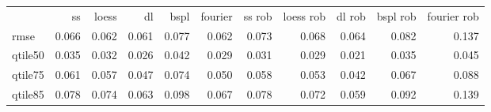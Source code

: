 \begin{tabular}{lrrrrrrrrrr}
 & ss & loess & dl & bspl & fourier & ss rob & loess rob & dl rob & bspl rob & fourier rob \\
rmse & {\cellcolor[HTML]{E1E1E1}} \color[HTML]{000000} 0.066 & {\cellcolor[HTML]{EEEEEE}} \color[HTML]{000000} 0.062 & {\cellcolor[HTML]{F1F1F1}} \color[HTML]{000000} 0.061 & {\cellcolor[HTML]{BFBFBF}} \color[HTML]{000000} 0.077 & {\cellcolor[HTML]{EEEEEE}} \color[HTML]{000000} 0.062 & {\cellcolor[HTML]{CBCBCB}} \color[HTML]{000000} 0.073 & {\cellcolor[HTML]{DBDBDB}} \color[HTML]{000000} 0.068 & {\cellcolor[HTML]{E7E7E7}} \color[HTML]{000000} 0.064 & {\cellcolor[HTML]{AFAFAF}} \color[HTML]{000000} 0.082 & {\cellcolor[HTML]{000000}} \color[HTML]{F1F1F1} 0.137 \\
qtile50 & {\cellcolor[HTML]{646464}} \color[HTML]{F1F1F1} 0.035 & {\cellcolor[HTML]{828282}} \color[HTML]{F1F1F1} 0.032 & {\cellcolor[HTML]{BFBFBF}} \color[HTML]{000000} 0.026 & {\cellcolor[HTML]{1D1D1D}} \color[HTML]{F1F1F1} 0.042 & {\cellcolor[HTML]{A0A0A0}} \color[HTML]{F1F1F1} 0.029 & {\cellcolor[HTML]{8D8D8D}} \color[HTML]{F1F1F1} 0.031 & {\cellcolor[HTML]{A0A0A0}} \color[HTML]{F1F1F1} 0.029 & {\cellcolor[HTML]{F1F1F1}} \color[HTML]{000000} 0.021 & {\cellcolor[HTML]{646464}} \color[HTML]{F1F1F1} 0.035 & {\cellcolor[HTML]{000000}} \color[HTML]{F1F1F1} 0.045 \\
qtile75 & {\cellcolor[HTML]{8E8E8E}} \color[HTML]{F1F1F1} 0.061 & {\cellcolor[HTML]{A2A2A2}} \color[HTML]{F1F1F1} 0.057 & {\cellcolor[HTML]{D7D7D7}} \color[HTML]{000000} 0.047 & {\cellcolor[HTML]{494949}} \color[HTML]{F1F1F1} 0.074 & {\cellcolor[HTML]{C7C7C7}} \color[HTML]{000000} 0.050 & {\cellcolor[HTML]{9D9D9D}} \color[HTML]{F1F1F1} 0.058 & {\cellcolor[HTML]{B7B7B7}} \color[HTML]{000000} 0.053 & {\cellcolor[HTML]{F1F1F1}} \color[HTML]{000000} 0.042 & {\cellcolor[HTML]{6D6D6D}} \color[HTML]{F1F1F1} 0.067 & {\cellcolor[HTML]{000000}} \color[HTML]{F1F1F1} 0.088 \\
qtile85 & {\cellcolor[HTML]{B8B8B8}} \color[HTML]{000000} 0.078 & {\cellcolor[HTML]{C4C4C4}} \color[HTML]{000000} 0.074 & {\cellcolor[HTML]{E5E5E5}} \color[HTML]{000000} 0.063 & {\cellcolor[HTML]{7C7C7C}} \color[HTML]{F1F1F1} 0.098 & {\cellcolor[HTML]{D9D9D9}} \color[HTML]{000000} 0.067 & {\cellcolor[HTML]{B8B8B8}} \color[HTML]{000000} 0.078 & {\cellcolor[HTML]{CACACA}} \color[HTML]{000000} 0.072 & {\cellcolor[HTML]{F1F1F1}} \color[HTML]{000000} 0.059 & {\cellcolor[HTML]{8E8E8E}} \color[HTML]{F1F1F1} 0.092 & {\cellcolor[HTML]{000000}} \color[HTML]{F1F1F1} 0.139 \\

\end{tabular}

